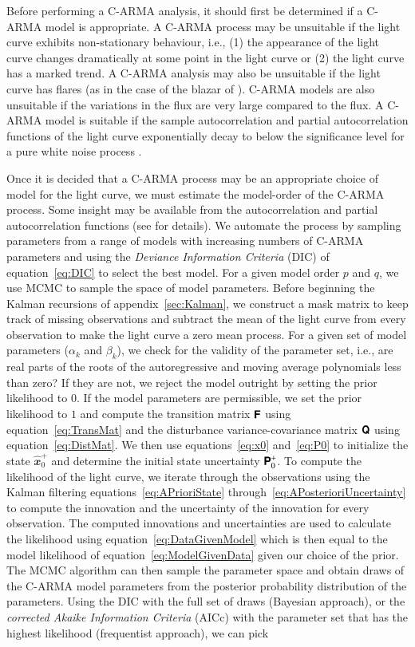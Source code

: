 \documentclass[a4paper,fleqn,usenatbib]{mnras}
\begin{document}
Before performing a C-ARMA analysis, it should first be determined if a C-ARMA model is appropriate. A C-ARMA process may be unsuitable if the light curve exhibits non-stationary behaviour, i.e., (1) the appearance of the light curve changes dramatically at some point in the light curve or (2) the light curve has a marked trend. A C-ARMA analysis may also be unsuitable if the light curve has flares (as in the case of the blazar of \citealp{Edelson13}). C-ARMA models are also unsuitable if the variations in the flux are very large compared to the flux. A C-ARMA model is suitable if the sample autocorrelation and partial autocorrelation functions of the light curve exponentially decay to below the significance level for a pure white noise process \citep{BrockwellDavisITSF}. 

Once it is decided that a C-ARMA process may be an appropriate choice of model for the light curve, we must estimate the model-order of the C-ARMA process. Some insight may be available from the autocorrelation and partial autocorrelation functions (see \citealp{BrockwellDavisITSF} for details). We automate the process by sampling parameters from a range of models with increasing numbers of C-ARMA parameters and using the \textit{Deviance Information Criteria} (DIC) of equation~\eqref{eq:DIC} to select the best model. For a given model order $p$ and $q$, we use MCMC to sample the space of model parameters. Before beginning the Kalman recursions of appendix~\ref{sec:Kalman}, we construct a mask matrix to keep track of missing observations and subtract the mean of the light curve from every observation to make the light curve a zero mean process. For a given set of model parameters ($\alpha_{k}$ and $\beta_{k}$), we check for the validity of the parameter set, i.e., are real parts of the roots of the autoregressive and moving average polynomials less than zero? If they are not, we reject the model outright by setting the prior likelihood to $0$. If the model parameters are permissible, we set the prior likelihood to $1$ and compute the transition matrix $\textbf{\textsf{F}}$ using equation~\eqref{eq:TransMat} and the disturbance variance-covariance matrix $\textbf{\textsf{Q}}$ using equation~\eqref{eq:DistMat}. We then use equations~\eqref{eq:x0} and~\eqref{eq:P0} to initialize the state $\widehat{\mathbfit{x}}^{+}_{0}$ and determine the initial state uncertainty $\textbf{\textsf{P}}^{+}_{0}$. To compute the likelihood of the light curve, we iterate through the observations using the Kalman filtering equations~\eqref{eq:APrioriState} through~\eqref{eq:APosterioriUncertainty} to compute the innovation and the uncertainty of the innovation for every observation. The computed innovations and uncertainties are used to calculate the likelihood using equation~\eqref{eq:DataGivenModel} which is then equal to the model likelihood of equation~\eqref{eq:ModelGivenData} given our choice of the prior. The MCMC algorithm can then sample the parameter space and obtain draws of the C-ARMA model parameters from the posterior probability distribution of the parameters. Using the DIC with the full set of draws (Bayesian approach), or the \textit{corrected Akaike Information Criteria} (AICc) with the parameter set that has the highest likelihood (frequentist approach), we can pick 
\end{document}
